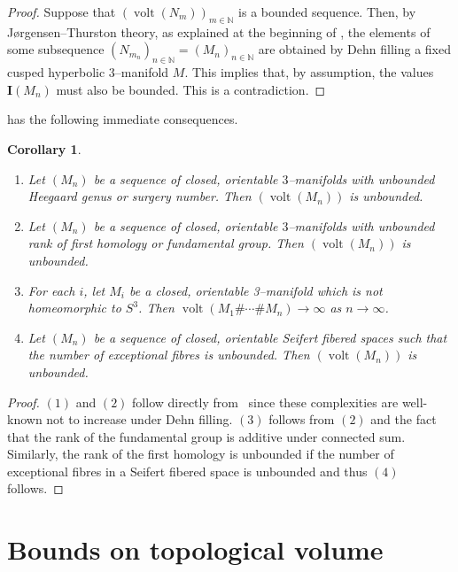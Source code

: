 \documentclass[a4paper]{gtart}
\newtheorem{corollary}[proposition]{Corollary}
\theoremstyle{definition}
\theoremstyle{remark}
\numberwithin{equation}{section}
\newcommand{\N}{\mathbb{N}}
\DeclareMathOperator{\volt}{volt}
\begin{document}
\begin{proof}
Suppose that $(\volt(N_m))_{m\in \N}$ is a bounded sequence. Then, by J\o{}rgensen--Thurston theory, as explained at the beginning of , the elements of some subsequence $(N_{m_n})_{n\in\N}=(M_n)_{n\in\N}$ are obtained by Dehn filling a fixed cusped hyperbolic $3$--manifold $M$. This implies that, by assumption, the values $\mathbf{I} (M_{n})$ must also be bounded. This is a contradiction.
\end{proof}

 has the following immediate consequences.

\begin{corollary}\label{cor:topinv}\hfill
	\begin{enumerate}
		\item Let $(M_n)$ be a sequence of closed, orientable $3$--manifolds with unbounded Heegaard genus or surgery number. Then $(\volt(M_n))$ is unbounded.
		\item Let $(M_n)$ be a sequence of closed, orientable $3$--manifolds with unbounded rank of first homology or fundamental group. Then $(\volt(M_n))$ is unbounded.
		\item For each $i$, let $M_i$ be a closed, orientable 3--manifold which is not homeomorphic to $S^3$. Then $\volt(M_1\#\cdots \#M_n) \to \infty$ as $n\to\infty$. 
		\item Let $(M_n)$ be a sequence of closed, orientable Seifert fibered spaces such that the number of exceptional fibres is unbounded. Then $(\volt(M_n))$ is unbounded. 
	\end{enumerate}
\end{corollary}

\begin{proof}
$(1)$ and $(2)$ follow directly from~ since these complexities are well-known not to increase under Dehn filling.
$(3)$ follows from $(2)$ and the fact that the rank of the fundamental group is additive under connected sum. Similarly, the rank of the first homology is unbounded if the number of exceptional fibres in a Seifert fibered space is unbounded and thus $(4)$ follows.
\end{proof}

\section{Bounds on topological volume}
\label{sec:bounds}
\end{document}
